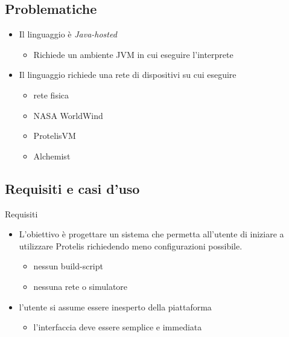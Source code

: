     \subsection{Problematiche}

    \begin{frame}{\insertsectionhead}{\insertsubsectionhead}

      \begin{block}{\insertsubsectionhead}
        \begin{itemize}[<+->]
          \item
            Il linguaggio è \emph{Java-hosted}
            \begin{itemize}
              \item Richiede un ambiente JVM in cui eseguire l'interprete
            \end{itemize}
          \item
            Il linguaggio richiede una rete di dispositivi su cui eseguire
            \begin{itemize}[<+->]
              \item rete fisica
              \item NASA WorldWind  %
              \item ProtelisVM      %
              \item Alchemist       %
            \end{itemize}
        \end{itemize}
      \end{block}
    \end{frame}

    \subsection{Requisiti e casi d'uso}

    \begin{frame}{\insertsectionhead}{\insertsubsectionhead}

      \begin{block}{Requisiti}
        \begin{itemize}
          \item
            L'obiettivo è progettare un sistema che permetta all'utente di iniziare a utilizzare Protelis richiedendo meno configurazioni possibile.
            \begin{itemize}
              \item nessun build-script
              \item nessuna rete o simulatore
            \end{itemize}
          \item
            l'utente si assume essere inesperto della piattaforma
            \begin{itemize}
              \item l'interfaccia deve essere semplice e immediata
            \end{itemize}
        \end{itemize}
      \end{block}

    \end{frame}

